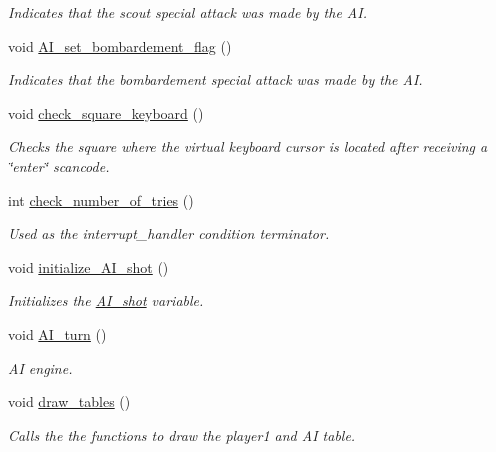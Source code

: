 \begin{DoxyCompactItemize}
\begin{DoxyCompactList}\small\item\em Indicates that the scout special attack was made by the A\-I. \end{DoxyCompactList}\item 
void \hyperlink{group___commodore_ga17552681cdf74f24229557f2cc8056c0}{A\-I\-\_\-set\-\_\-bombardement\-\_\-flag} ()
\begin{DoxyCompactList}\small\item\em Indicates that the bombardement special attack was made by the A\-I. \end{DoxyCompactList}\item 
void \hyperlink{group___commodore_gad58b0a5817f6daa4c4de3af8d1c64467}{check\-\_\-square\-\_\-keyboard} ()
\begin{DoxyCompactList}\small\item\em Checks the square where the virtual keyboard cursor is located after receiving a \char`\"{}enter\char`\"{} scancode. \end{DoxyCompactList}\item 
int \hyperlink{group___commodore_ga8149c87752bf6329fd86794fd59d6122}{check\-\_\-number\-\_\-of\-\_\-tries} ()
\begin{DoxyCompactList}\small\item\em Used as the interrupt\-\_\-handler condition terminator. \end{DoxyCompactList}\item 
void \hyperlink{group___commodore_ga6f7ab37f6d84f4bdc562359d8a86aa1f}{initialize\-\_\-\-A\-I\-\_\-shot} ()
\begin{DoxyCompactList}\small\item\em Initializes the \hyperlink{struct_a_i__shot}{A\-I\-\_\-shot} variable. \end{DoxyCompactList}\item 
void \hyperlink{group___commodore_ga1172507e6403996d29bfd724f618400f}{A\-I\-\_\-turn} ()
\begin{DoxyCompactList}\small\item\em A\-I engine. \end{DoxyCompactList}\item 
void \hyperlink{group___commodore_ga5ed850743c2cce117572f02bb913ce53}{draw\-\_\-tables} ()
\begin{DoxyCompactList}\small\item\em Calls the the functions to draw the player1 and A\-I table. \end{DoxyCompactList}\item 

\end{DoxyCompactItemize}
